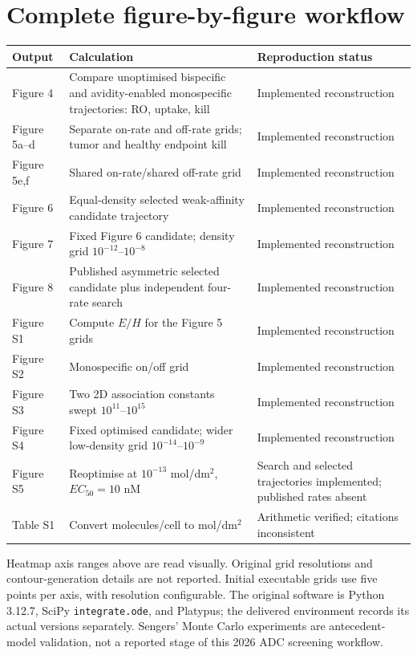 \documentclass[11pt,a4paper]{article}
\begin{document}
\section{Complete figure-by-figure workflow}
\begin{longtable}{p{.17\linewidth}p{.56\linewidth}p{.21\linewidth}}
\toprule Output & Calculation & Reproduction status\\\midrule\endhead
Figure 4 & Compare unoptimised bispecific and avidity-enabled monospecific trajectories: RO, uptake, kill & Implemented reconstruction\\
Figure 5a--d & Separate on-rate and off-rate grids; tumor and healthy endpoint kill & Implemented reconstruction\\
Figure 5e,f & Shared on-rate/shared off-rate grid & Implemented reconstruction\\
Figure 6 & Equal-density selected weak-affinity candidate trajectory & Implemented reconstruction\\
Figure 7 & Fixed Figure 6 candidate; density grid $10^{-12}$--$10^{-8}$ & Implemented reconstruction\\
Figure 8 & Published asymmetric selected candidate plus independent four-rate search & Implemented reconstruction\\
Figure S1 & Compute $E/H$ for the Figure 5 grids & Implemented reconstruction\\
Figure S2 & Monospecific on/off grid & Implemented reconstruction\\
Figure S3 & Two 2D association constants swept $10^{11}$--$10^{15}$ & Implemented reconstruction\\
Figure S4 & Fixed optimised candidate; wider low-density grid $10^{-14}$--$10^{-9}$ & Implemented reconstruction\\
Figure S5 & Reoptimise at $10^{-13}$ mol/dm$^2$, $EC_{50}=10$ nM & Search and selected trajectories implemented; published rates absent\\
Table S1 & Convert molecules/cell to mol/dm$^2$ & Arithmetic verified; citations inconsistent\\
\bottomrule
\end{longtable}
Heatmap axis ranges above are read visually. Original grid resolutions and contour-generation details are not reported. Initial executable grids use five points per axis, with resolution configurable. The original software is Python 3.12.7, SciPy \texttt{integrate.ode}, and Platypus; the delivered environment records its actual versions separately. Sengers' Monte Carlo experiments are antecedent-model validation, not a reported stage of this 2026 ADC screening workflow.
\end{document}
